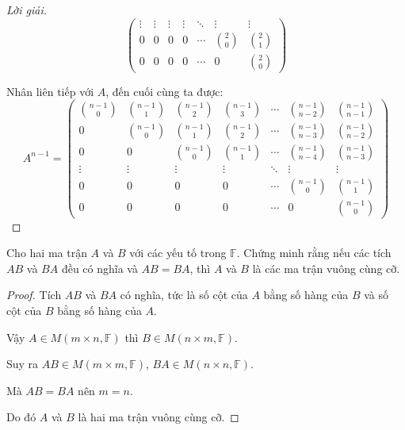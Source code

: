 \documentclass[class=nhvh-linear-algebra,crop=false]{standalone}
\begin{document}
\begin{proof}[Lời giải]
\[\begin{pmatrix}
            \vdots       & \vdots       & \vdots       & \vdots       & \ddots & \vdots       & \vdots       \\
            0            & 0            & 0            & 0            & \cdots & \binom{2}{0} & \binom{2}{1} \\
            0            & 0            & 0            & 0            & \cdots & 0            & \binom{2}{0}
        \end{pmatrix}
    \]
    \par Nhân liên tiếp với $A$, đến cuối cùng ta được:
    \[
        A^{n-1} =
        \begin{pmatrix}
            \binom{n-1}{0} & \binom{n-1}{1} & \binom{n-1}{2} & \binom{n-1}{3} & \cdots & \binom{n-1}{n-2} & \binom{n-1}{n-1} \\
            0              & \binom{n-1}{0} & \binom{n-1}{1} & \binom{n-1}{2} & \cdots & \binom{n-1}{n-3} & \binom{n-1}{n-2} \\
            0              & 0              & \binom{n-1}{0} & \binom{n-1}{1} & \cdots & \binom{n-1}{n-4} & \binom{n-1}{n-3} \\
            \vdots         & \vdots         & \vdots         & \vdots         & \ddots & \vdots           & \vdots           \\
            0              & 0              & 0              & 0              & \cdots & \binom{n-1}{0}   & \binom{n-1}{1}   \\
            0              & 0              & 0              & 0              & \cdots & 0                & \binom{n-1}{0}
        \end{pmatrix}
    \]
\end{proof}

\begin{exercise}
    Cho hai ma trận $A$ và $B$ với các yếu tố trong $\mathbb{F}$. Chứng minh rằng nếu các tích $AB$ và $BA$ đều có nghĩa và $AB = BA$, thì $A$ và $B$ là các ma trận vuông cùng cỡ.
\end{exercise}

\begin{proof}
    Tích $AB$ và $BA$ có nghĩa, tức là số cột của $A$ bằng số hàng của $B$ và số cột của $B$ bằng số hàng của $A$.
    \par Vậy $A\in M(m\times n,\mathbb{F})$ thì $B\in M(n\times m, \mathbb{F})$.
    \par Suy ra $AB\in M(m\times m,\mathbb{F})$, $BA\in M(n\times n,\mathbb{F})$.
    \par Mà $AB = BA$ nên $m = n$.
    \par Do đó $A$ và $B$ là hai ma trận vuông cùng cỡ.
\end{proof}
\end{document}
